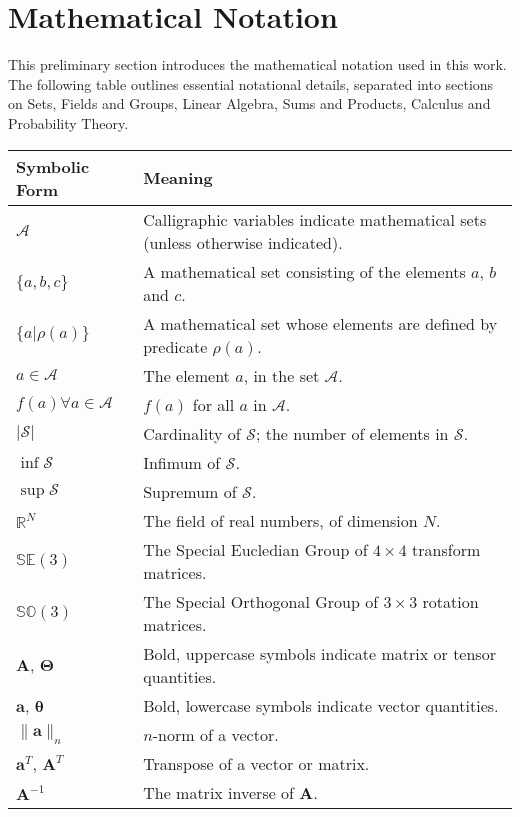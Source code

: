 \section*{Mathematical Notation}
This preliminary section introduces the mathematical notation used in this work. The following 
table outlines essential notational details, separated into sections on Sets, Fields and Groups, 
Linear Algebra, Sums and Products, Calculus and Probability Theory.
\begin{longtable}{p{} | p{}}
  \midrule
  Symbolic Form & Meaning \\
  \midrule
  \( \mathcal{A} \) & Calligraphic variables indicate mathematical sets (unless otherwise indicated).\\
  \( \{ a, b, c \} \) & A mathematical set consisting of the elements \( a \), \( b \) and \( c \).\\
  \( \{ a | \rho(a) \} \) & A mathematical set whose elements are defined by predicate \( \rho(a) \).\\
  \( a \in \mathcal{A} \) & The element \( a \), in the set \( \mathcal{A} \).\\
  \( f(a) \forall a \in \mathcal{A} \) & \( f(a) \) for all \( a \) in \( \mathcal{A} \).\\
  \( | \mathcal{S} | \) & Cardinality of \( \mathcal{S} \); the number of elements in \( \mathcal{S} \).\\
  \( \inf \mathcal{S} \) & Infimum of \( \mathcal{S} \).\\
  \( \sup \mathcal{S} \) & Supremum of \( \mathcal{S} \).\\
  \midrule
  \( \mathbb{R}^{N} \) & The field of real numbers, of dimension \( N \).\\
  \( \mathbb{SE}(3) \) & The Special Eucledian Group of \( 4 \times 4 \) transform matrices.\\
  \( \mathbb{SO}(3) \) & The Special Orthogonal Group of \( 3 \times 3 \) rotation matrices.\\
  \midrule
  \( \bm{A}\), \( \bm{\Theta} \) & Bold, uppercase symbols indicate matrix or tensor quantities.\\
  \( \bm{a}\), \( \bm{\theta} \) & Bold, lowercase symbols indicate vector quantities.\\
  \( \lVert \bm{a} \rVert_{n} \) & \( n \)-norm of a vector.\\
  \( \bm{a}^{T} \), \( \bm{A}^{T} \) & Transpose of a vector or matrix.\\
  \( \bm{A}^{-1} \) & The matrix inverse of \( \bm{A} \).\\

\end{longtable}
